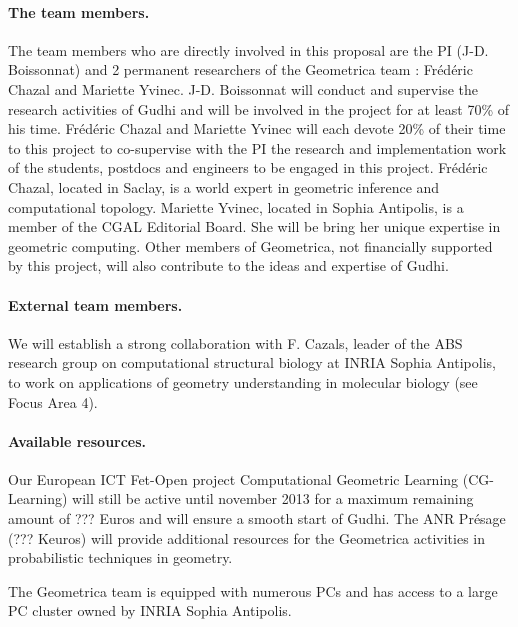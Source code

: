 \paragraph{The team members.}
The team members who are directly involved in this proposal are the PI (J-D. Boissonnat) and 2 permanent researchers of the Geometrica team : Fr\'ed\'eric Chazal and Mariette Yvinec.  J-D. Boissonnat will conduct and supervise the research activities of Gudhi and will be involved in the project for at least 70\% of his time.  Fr\'ed\'eric Chazal and Mariette Yvinec will each devote 20\% of their time to this project to co-supervise with the PI the research and implementation work of the students, postdocs and engineers to be engaged in this project. Fr\'ed\'eric Chazal, located in Saclay,  is a world expert in geometric inference and computational topology. Mariette Yvinec, located in Sophia Antipolis,  is a member of the CGAL Editorial Board. She  will be bring her unique expertise in geometric computing. Other members of Geometrica, not financially supported by this project, will also contribute to the ideas and expertise of Gudhi.

\paragraph{External team members.} We will establish a strong collaboration with F. Cazals, leader of the ABS research group on computational structural biology at INRIA Sophia Antipolis, to work on applications of geometry understanding in molecular biology (see Focus Area 4).

\paragraph{Available resources.} Our European ICT Fet-Open project Computational Geometric Learning (CG-Learning) will still be active until november 2013 for a maximum remaining amount of ??? Euros and will ensure a smooth start of Gudhi.  The ANR Pr\'esage (??? Keuros) will provide additional resources for the Geometrica activities in probabilistic techniques in geometry.

The Geometrica team is equipped with numerous PCs and has access to a large PC cluster owned by INRIA Sophia Antipolis.

